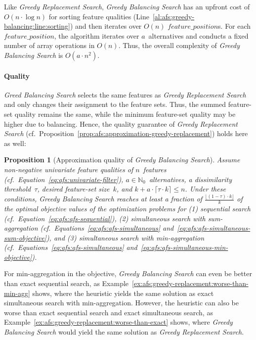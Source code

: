 \documentclass{article}
\newtheorem{proposition}{Proposition}
\theoremstyle{definition}
\begin{document}
Like \emph{Greedy Replacement Search}, \emph{Greedy Balancing Search} has an upfront cost of $O(n \cdot \log n)$ for sorting feature qualities (Line~\ref{al:afs:greedy-balancing:line:sorting}) and then iterates over $O(n)$ $feature\_position$s.
For each $feature\_position$, the algorithm iterates over $a$~alternatives and conducts a fixed number of array operations in $O(n)$.
Thus, the overall complexity of \emph{Greedy Balancing Search} is $O(a \cdot n^2)$.

\paragraph{Quality}

\emph{Greed Balancing Search} selects the same features as \emph{Greedy Replacement Search} and only changes their assignment to the feature sets.
Thus, the summed feature-set quality remains the same, while the minimum feature-set quality may be higher due to balancing.
Hence, the quality guarantee of \emph{Greedy Replacement Search} (cf.~Proposition~\ref{prop:afs:approximation-greedy-replacement}) holds here as well:
%
\begin{proposition}[Approximation quality of \emph{Greedy Balancing Search}]
	Assume non-negative univariate feature qualities of $n$~features (cf.~Equation~\ref{eq:afs:univariate-filter}), $a \in \mathbb{N}_0$~alternatives, a dissimilarity threshold~$\tau$, desired feature-set size~$k$, and $k + a \cdot \lceil \tau \cdot k \rceil \leq n$.
	Under these conditions, \emph{Greedy Balancing Search} reaches at least a fraction of $\frac{\lfloor (1 - \tau) \cdot k \rfloor}{k}$ of the optimal objective values of the optimization problems for (1) sequential search (cf.~Equation~\ref{eq:afs:afs-sequential}), (2) simultaneous search with sum-aggregation (cf.~Equations~\ref{eq:afs:afs-simultaneous} and~\ref{eq:afs:afs-simultaneous-sum-objective}), and (3) simultaneous search with min-aggregation (cf.~Equations~\ref{eq:afs:afs-simultaneous} and~\ref{eq:afs:afs-simultaneous-min-objective}).
	\label{prop:afs:approximation-greedy-balancing}
\end{proposition}
%
For min-aggregation in the objective, \emph{Greedy Balancing Search} can even be better than exact sequential search, as Example~\ref{ex:afs:greedy-replacement:worse-than-min-agg} shows, where the heuristic yields the same solution as exact simultaneous search with min-aggregation.
However, the heuristic can also be worse than exact sequential search and exact simultaneous search, as Example~\ref{ex:afs:greedy-replacement:worse-than-exact} shows, where \emph{Greedy Balancing Search} would yield the same solution as \emph{Greedy Replacement Search}.
\end{document}
